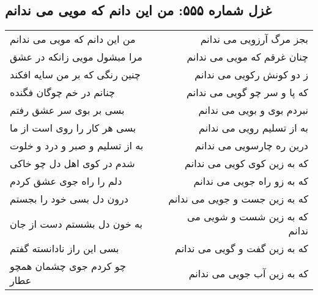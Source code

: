 \begin{center}
\section*{غزل شماره ۵۵۵: من این دانم که مویی می ندانم}
\label{sec:555}
\begin{longtable}{l p{0.5cm} r}
من این دانم که مویی می ندانم
&&
بجز مرگ آرزویی می ندانم
\\
مرا مبشول مویی زانکه در عشق
&&
چنان غرقم که مویی می ندانم
\\
چنین رنگی که بر من سایه افکند
&&
ز دو کونش رکویی می ندانم
\\
چنانم در خم چوگان فگنده
&&
که پا و سر چو گویی می ندانم
\\
بسی بر بوی سر عشق رفتم
&&
نبردم بوی و بویی می ندانم
\\
بسی هر کار را روی است از ما
&&
به از تسلیم رویی می ندانم
\\
به از تسلیم و صبر و درد و خلوت
&&
درین ره چارسویی می ندانم
\\
شدم در کوی اهل دل چو خاکی
&&
که به زین کوی کویی می ندانم
\\
دلم را راه جوی عشق کردم
&&
که به زو راه جویی می ندانم
\\
درون دل بسی خود را بجستم
&&
که به زین جست و جویی می ندانم
\\
به خون دل بشستم دست از جان
&&
که به زین شست و شویی می ندانم
\\
بسی این راز نادانسته گفتم
&&
که به زین گفت و گویی می ندانم
\\
چو کردم جوی چشمان همچو عطار
&&
که به زین آب جویی می ندانم
\\
\end{longtable}
\end{center}
